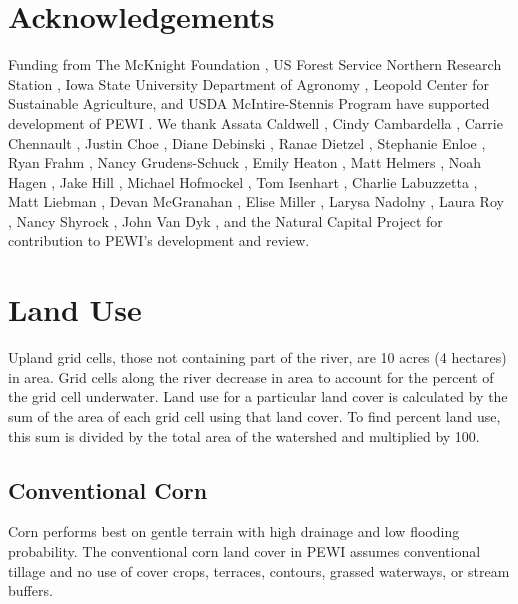 \documentclass[11pt]{article}
\begin{document}
\section*{Acknowledgements}
Funding from The McKnight Foundation , US Forest Service Northern Research Station , Iowa State University Department of Agronomy , Leopold Center for Sustainable Agriculture, and USDA McIntire-Stennis Program have supported development of PEWI . We thank Assata Caldwell , Cindy Cambardella , Carrie Chennault , Justin Choe , Diane Debinski , Ranae Dietzel , Stephanie Enloe , Ryan Frahm , Nancy Grudens-Schuck , Emily Heaton , Matt Helmers , Noah Hagen , Jake Hill , Michael Hofmockel , Tom Isenhart , Charlie Labuzzetta , Matt Liebman , Devan McGranahan , Elise Miller , Larysa Nadolny , Laura Roy , Nancy Shyrock , John Van Dyk , and the Natural Capital Project for contribution to PEWI’s development and review.
\cleardoublepage


\tableofcontents
\thispagestyle{empty} %
\cleardoublepage %

\setcounter{page}{1}


\section{Land Use}\label{sec:landuse}
Upland grid cells, those not containing part of the river, are 10 acres (4 hectares) in area. Grid cells along the river decrease in area to account for the percent of the grid cell underwater. Land use for a particular land cover is calculated by the sum of the area of each grid cell using that land cover. To find percent land use, this sum is divided by the total area of the watershed and multiplied by 100.

\subsection{Conventional Corn}

Corn performs best on gentle terrain with high drainage and low flooding probability. The conventional corn land cover in PEWI assumes conventional tillage and no use of cover crops, terraces, contours, grassed waterways, or stream buffers.
\end{document}
